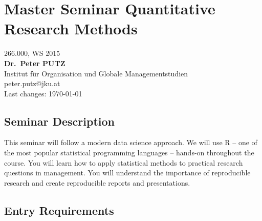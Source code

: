 \documentclass[]{article}
\author{}
\date{}
\begin{document}

\centering

\section{Master Seminar Quantitative Research
Methods}\label{master-seminar-quantitative-research-methods}

266.000, WS 2015\\\textbf{Dr.~Peter PUTZ}\\Institut für Organisation und
Globale Managementstudien\\peter.putz@jku.at\\Last changes: \today

\raggedright

\subsection{Seminar Description}\label{seminar-description}

This seminar will follow a modern data science approach. We will use R
-- one of the most popular statistical programming languages -- hands-on
throughout the course. You will learn how to apply statistical methods
to practical research questions in management. You will understand the
importance of reproducible research and create reproducible reports and
presentations.

\subsection{Entry Requirements}\label{entry-requirements}
\end{document}
